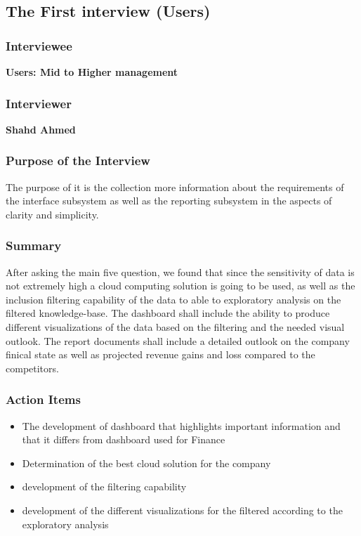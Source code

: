 \documentclass{article}
\begin{document}
\subsection{The First interview (Users)}
\subsubsection{Interviewee}
\textbf{Users: Mid to Higher management}
\subsubsection{Interviewer}
\textbf{Shahd Ahmed}
\subsubsection{Purpose of the Interview}
The purpose of it is the collection more information about the requirements of the interface subsystem as well as the reporting subsystem in the aspects of clarity and simplicity.
\subsubsection{Summary}
After asking the main five question, we found that since the sensitivity of data is not extremely high a cloud computing solution is going to be used, as well as the inclusion filtering capability of the data to able to exploratory analysis on the filtered knowledge-base. The dashboard shall include the ability to produce different visualizations of the data based on the filtering and the needed visual outlook. The report documents shall include a detailed outlook on the company finical state as well as projected revenue gains and loss compared to the competitors.
\subsubsection{Action Items}
\begin{itemize}
    \item The development of dashboard that highlights important information and that it differs from dashboard used for Finance
    \item Determination of the best cloud solution for the company
    \item development of the filtering capability
    \item development of the different visualizations for the filtered according to the exploratory analysis
\end{itemize}
\end{document}
